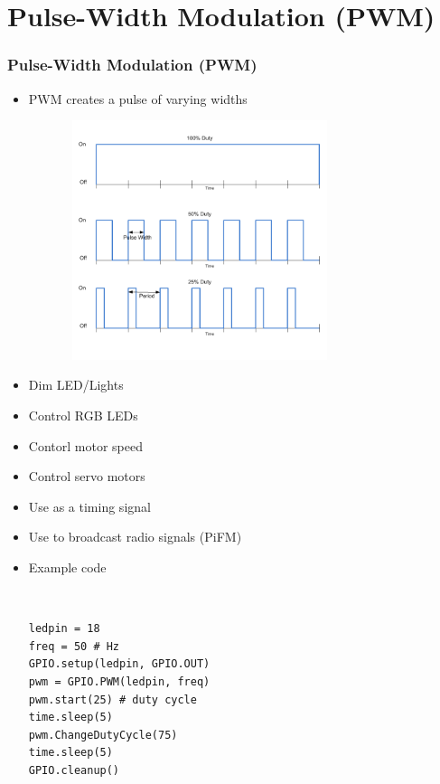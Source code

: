 \documentclass[slidestop,usepdftitle=false,14pt,table]{beamer}
\begin{document}
\section{Pulse-Width Modulation (PWM)}
\begin{frame}
\frametitle{Pulse-Width Modulation (PWM)}
\begin{itemize}
\item PWM creates a pulse of varying widths\\
{\begin{center}
\includegraphics[width=10cm,height=7cm,keepaspectratio]{img/pwm.png}
\end{center}}
\item Dim LED/Lights
\item Control RGB LEDs
\item Contorl motor speed
\item Control servo motors
\item Use as a timing signal
\item Use to broadcast radio signals (PiFM)
\item Example code\\
    {\tt\small
\begin{verbatim}
ledpin = 18
freq = 50 # Hz
GPIO.setup(ledpin, GPIO.OUT)
pwm = GPIO.PWM(ledpin, freq)
pwm.start(25) # duty cycle
time.sleep(5)
pwm.ChangeDutyCycle(75)
time.sleep(5)
GPIO.cleanup()
\end{verbatim}
    }
\end{itemize}
\end{frame}
\end{document}
